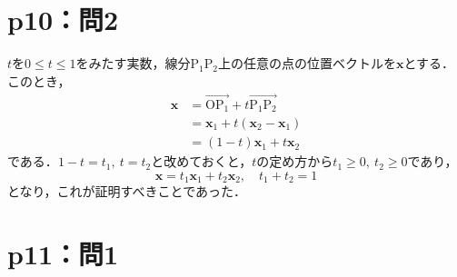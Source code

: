\section*{p10：問2}
\begin{tproof}
  $t$を$0 \le t \le 1$をみたす実数，線分$\mathrm{P_1 P_2}$上の任意の点の位置ベクトルを$\bm{x}$とする．
  このとき，
  \begin{align*}
    \bm{x} & = \overrightarrow{\mathrm{O P_1}}+t\overrightarrow{\mathrm{P_1 P_2}} \\
           & = \bm{x}_1 + t (\bm{x}_2 - \bm{x}_1)                                 \\
           & = (1-t) \bm{x}_1 + t \bm{x}_2
  \end{align*}
  である．$1-t = t_1,~t=t_2$と改めておくと，$t$の定め方から$t_1 \ge 0,~t_2 \ge 0$であり，
  \[
    \bm{x}= t_1 \bm{x}_1 + t_2 \bm{x}_2 ,\quad t_1 + t_2 =1
  \]
  となり，これが証明すべきことであった．
\end{tproof}


\section*{p11：問1}

